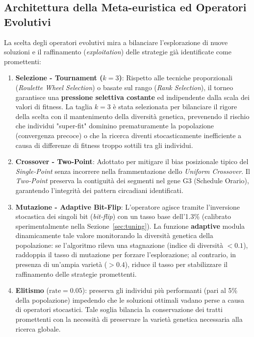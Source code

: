 \subsection{Architettura della Meta-euristica ed Operatori Evolutivi}
\label{sec:operators}
La scelta degli operatori evolutivi mira a bilanciare l'esplorazione di nuove soluzioni e il raffinamento (\textit{exploitation}) delle strategie già identificate come promettenti:

\begin{enumerate}
    \item \textbf{Selezione - Tournament ($k=3$)}: Rispetto alle tecniche proporzionali (\textit{Roulette Wheel Selection}) o basate sul rango (\textit{Rank Selection}), il torneo garantisce una \textbf{pressione selettiva costante} ed indipendente dalla scala dei valori di fitness. La taglia $k=3$ è stata selezionata per bilanciare il rigore della scelta con il mantenimento della diversità genetica, prevenendo il rischio che individui "super-fit" dominino prematuramente la popolazione (convergenza precoce) o che la ricerca diventi stocasticamente inefficiente a causa di differenze di fitness troppo sottili tra gli individui.

    \item \textbf{Crossover - Two-Point}: Adottato per mitigare il bias posizionale tipico del \textit{Single-Point} senza incorrere nella frammentazione dello \textit{Uniform Crossover}. Il \textit{Two-Point} preserva la contiguità dei segmenti nel gene G3 (Schedule Orario), garantendo l'integrità dei pattern circadiani identificati.

    \item \textbf{Mutazione - Adaptive Bit-Flip}: L'operatore agisce tramite l'inversione stocastica dei singoli bit (\textit{bit-flip}) con un tasso base dell'1.3\% (calibrato sperimentalmente nella Sezione~\ref{sec:tuning}). La funzione \textbf{adaptive} modula dinamicamente tale valore monitorando la diversità genetica della popolazione: se l'algoritmo rileva una stagnazione (indice di diversità $<0.1$), raddoppia il tasso di mutazione per forzare l'esplorazione; al contrario, in presenza di un'ampia varietà ($>0.4$), riduce il tasso per stabilizzare il raffinamento delle strategie promettenti.

    \item \textbf{Elitismo} ($\text{rate}=0.05$): preserva gli individui più performanti (pari al 5\% della popolazione) impedendo che le soluzioni ottimali vadano perse a causa di operatori stocastici. Tale soglia bilancia la conservazione dei tratti promettenti con la necessità di preservare la varietà genetica necessaria alla ricerca globale.
\end{enumerate}

